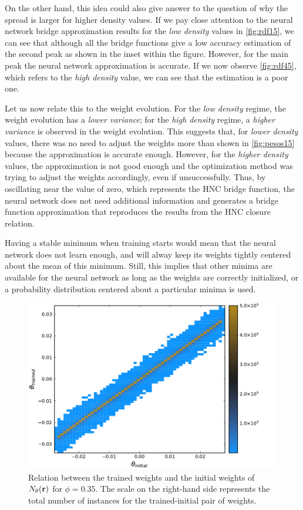 On the other hand, this idea could also give answer to the question of why the spread
is larger for higher density values. If we pay close attention to the neural network bridge
approximation results for the \emph{low density} values in \autoref{fig:rdf15}, we can see 
that although all the bridge functions give a low accuracy estimation of the second peak as shown in the inset within the figure. However, for the main peak the neural network 
approximation is accurate.
If we now observe \autoref{fig:rdf45}, which refers to the \emph{high density} value,
we can see that the estimation is a poor one.

Let us now relate this to the weight evolution. For the \emph{low density} regime, the 
weight evolution has a \emph{lower variance}; for the \emph{high density} regime, a \emph{higher variance} is observed in the weight evolution.
This suggests that, for \emph{lower density} values, there was no need to adjust the
weights more than shown in \autoref{fig:pesos15} because the approximation is accurate
enough. However, for the \emph{higher density} values, the approximation is not good enough
and the optimization method was trying to adjust the weights accordingly, even if
unsuccessfully.
Thus, by oscillating near the value of zero, which represents the HNC bridge function,
the neural network does not need additional information and generates a bridge function 
approximation that reproduces the results from the HNC closure relation.

Having a stable minimum when training starts would mean that the neural network does not
learn enough, and will alway keep its weights tightly centered about the mean of this
minimum. Still, this implies that other minima are available for the neural network as long
as the weights are correctly initialized, or a probability distribution centered about
a particular minima is used.

\begin{figure}[t]
    \includegraphics[width=\textwidth]{figuras/capitulo-3/weights_phi=0.35.pdf}
    \caption[Comparison between weights, $\phi=0.35$.]{Relation between the trained weights and the initial weights of $N_{\theta}(\mathbf{r})$ for $\phi=0.35$. The scale on the right-hand side represents the total number of instances for the trained-initial pair of weights.}
    \label{fig:pesos35}
\end{figure}

